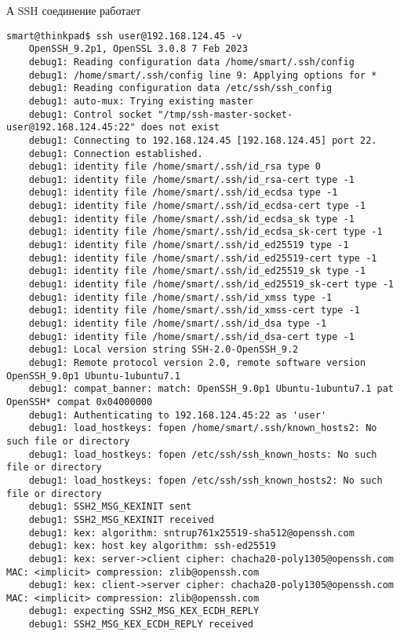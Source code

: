 А SSH соединение работает
\begin{Verbatim}[frame=single,breaklines=true,breakanywhere=true]
    smart@thinkpad$ ssh user@192.168.124.45 -v
    OpenSSH_9.2p1, OpenSSL 3.0.8 7 Feb 2023
    debug1: Reading configuration data /home/smart/.ssh/config
    debug1: /home/smart/.ssh/config line 9: Applying options for *
    debug1: Reading configuration data /etc/ssh/ssh_config
    debug1: auto-mux: Trying existing master
    debug1: Control socket "/tmp/ssh-master-socket-user@192.168.124.45:22" does not exist
    debug1: Connecting to 192.168.124.45 [192.168.124.45] port 22.
    debug1: Connection established.
    debug1: identity file /home/smart/.ssh/id_rsa type 0
    debug1: identity file /home/smart/.ssh/id_rsa-cert type -1
    debug1: identity file /home/smart/.ssh/id_ecdsa type -1
    debug1: identity file /home/smart/.ssh/id_ecdsa-cert type -1
    debug1: identity file /home/smart/.ssh/id_ecdsa_sk type -1
    debug1: identity file /home/smart/.ssh/id_ecdsa_sk-cert type -1
    debug1: identity file /home/smart/.ssh/id_ed25519 type -1
    debug1: identity file /home/smart/.ssh/id_ed25519-cert type -1
    debug1: identity file /home/smart/.ssh/id_ed25519_sk type -1
    debug1: identity file /home/smart/.ssh/id_ed25519_sk-cert type -1
    debug1: identity file /home/smart/.ssh/id_xmss type -1
    debug1: identity file /home/smart/.ssh/id_xmss-cert type -1
    debug1: identity file /home/smart/.ssh/id_dsa type -1
    debug1: identity file /home/smart/.ssh/id_dsa-cert type -1
    debug1: Local version string SSH-2.0-OpenSSH_9.2
    debug1: Remote protocol version 2.0, remote software version OpenSSH_9.0p1 Ubuntu-1ubuntu7.1
    debug1: compat_banner: match: OpenSSH_9.0p1 Ubuntu-1ubuntu7.1 pat OpenSSH* compat 0x04000000
    debug1: Authenticating to 192.168.124.45:22 as 'user'
    debug1: load_hostkeys: fopen /home/smart/.ssh/known_hosts2: No such file or directory
    debug1: load_hostkeys: fopen /etc/ssh/ssh_known_hosts: No such file or directory
    debug1: load_hostkeys: fopen /etc/ssh/ssh_known_hosts2: No such file or directory
    debug1: SSH2_MSG_KEXINIT sent
    debug1: SSH2_MSG_KEXINIT received
    debug1: kex: algorithm: sntrup761x25519-sha512@openssh.com
    debug1: kex: host key algorithm: ssh-ed25519
    debug1: kex: server->client cipher: chacha20-poly1305@openssh.com MAC: <implicit> compression: zlib@openssh.com
    debug1: kex: client->server cipher: chacha20-poly1305@openssh.com MAC: <implicit> compression: zlib@openssh.com
    debug1: expecting SSH2_MSG_KEX_ECDH_REPLY
    debug1: SSH2_MSG_KEX_ECDH_REPLY received

\end{Verbatim}
